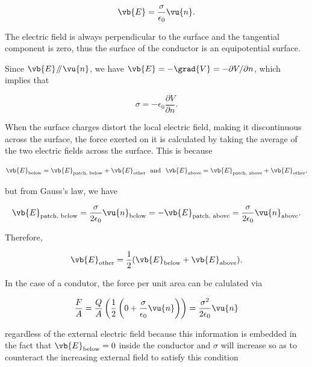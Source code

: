 \documentclass[english,a4paper,12pt]{report}
\begin{document}
\begin{equation}
    \vb{E} = \frac{\sigma }{\epsilon_0} \vu{n}. 
\end{equation}

The electric field is always perpendicular to the surface and the tangential component is zero, thus the surface of the conductor is an equipotential surface.

Since \(\vb{E} \mathbin{\!/\mkern-5mu/\!} \vu{n} \), we have \(\vb{E} = - \grad{V} = - \partial V / \partial n\), which implies that 

\begin{equation}
    \sigma = -\epsilon _{0}\frac{\partial V}{\partial n}.  
\end{equation}

When the surface charges distort the local electric field, making it discontinuous across the surface, the force exerted on it is calculated by taking the average of the two electric fields across the surface. This is because

\begin{equation}
    \vb{E} _{\text{below} } = \vb{E} _{\text{patch, below} } + \vb{E} _{\text{other} } ~\text { and }~ \vb{E} _{\text{above} } = \vb{E} _{\text{patch, above} } + \vb{E} _{\text{other} },  
\end{equation}

but from Gauss's law, we have

\begin{equation}
    \vb{E} _{\text{patch, below} } = \frac{\sigma }{2 \epsilon _0}\vu{n} _{\text{below} } = - \vb{E} _{\text{patch, above} } = \frac{\sigma }{2 \epsilon _0}\vu{n} _{\text{above} }.    
\end{equation}

Therefore, 

\begin{equation}
    \vb{E} _{\text{other} } = \frac{1}{2}(\vb{E} _{\text{below} } + \vb{E} _{\text{above} }  ).   
\end{equation}

In the case of a condutor, the force per unit area can be calulated via

\begin{equation}
    \frac{F}{A} = \frac{Q}{A}\left( \frac{1}{2} \left( 0 + \frac{\sigma }{\epsilon _{0} }\vu{n}   \right)  \right) = \frac{\sigma ^2}{2\epsilon _{0} }\vu{n}
\end{equation}

regardless of the external electric field because this information is embedded in the fact that \(\vb{E} _{\text{below} } = 0 \) inside the conductor and \(\sigma \) will increase so as to counteract the increasing external field to satisfy this condition  
\end{document}
